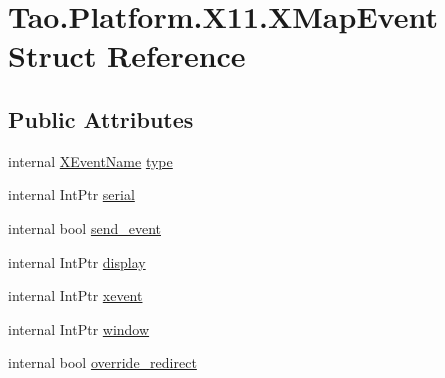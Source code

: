 \hypertarget{struct_tao_1_1_platform_1_1_x11_1_1_x_map_event}{
\section{Tao.Platform.X11.XMapEvent Struct Reference}
\label{struct_tao_1_1_platform_1_1_x11_1_1_x_map_event}
}
\subsection*{Public Attributes}
\begin{DoxyCompactItemize}
\item 
internal \hyperlink{namespace_tao_1_1_platform_1_1_x11_aff81ed5b8778e1ea8e872861dff9f146}{XEventName} \hyperlink{struct_tao_1_1_platform_1_1_x11_1_1_x_map_event_a316b637457e9898775927ddbaeca45cd}{type}
\item 
internal IntPtr \hyperlink{struct_tao_1_1_platform_1_1_x11_1_1_x_map_event_a1dc325d8590c607e012370c955bbfc05}{serial}
\item 
internal bool \hyperlink{struct_tao_1_1_platform_1_1_x11_1_1_x_map_event_ac3f6bac63a355a871d8e385b8de94ae1}{send\_\-event}
\item 
internal IntPtr \hyperlink{struct_tao_1_1_platform_1_1_x11_1_1_x_map_event_acfab687760d00731046e7c1d13f4e02d}{display}
\item 
internal IntPtr \hyperlink{struct_tao_1_1_platform_1_1_x11_1_1_x_map_event_a5cadc9af333118a7f6a71315da0dfdbe}{xevent}
\item 
internal IntPtr \hyperlink{struct_tao_1_1_platform_1_1_x11_1_1_x_map_event_a1bc9e27b12738df48564282b50bba0e0}{window}
\item 
internal bool \hyperlink{struct_tao_1_1_platform_1_1_x11_1_1_x_map_event_a6cd63e678f3517dd93a5746c58ff584a}{override\_\-redirect}
\end{DoxyCompactItemize}


